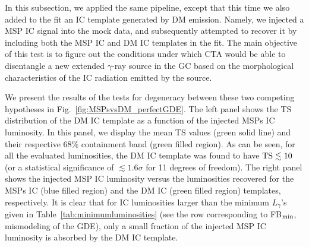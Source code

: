 \documentclass[doublespace,nopageskip]{VTthesis} %
\begin{document}
In this subsection, we applied the same pipeline, except that this time we also added to the fit an IC template generated by DM emission. Namely, we injected a MSP IC signal into the mock data, and subsequently attempted to recover it by including both the MSP IC and DM IC templates in the fit. The main objective of this test is to figure out the conditions under which CTA would be able to disentangle a new extended $\gamma$-ray source in the GC based on the morphological characteristics of the IC radiation emitted by the source.

We present the results of the tests for degeneracy between these two competing hypotheses in Fig.~\ref{fig:MSPsvsDM_perfectGDE}. The left panel shows the TS distribution of the DM IC template as a function of the injected MSPs IC luminosity. In this panel, we display the mean TS values (green solid line) and their respective 68\% containment band (green filled region). As can be seen, for all the evaluated luminosities, the DM IC template was found to have ${\rm TS}\lesssim 10$ (or a statistical significance of $\lesssim 1.6\sigma$ for 11 degrees of freedom). The right panel shows the injected MSP IC luminosity versus the luminosities recovered for the MSPs IC (blue filled region) and the DM IC (green filled region) templates, respectively. It is clear that for IC luminosities larger than the minimum $L_{\gamma}$'s given in Table~\ref{tab:minimumluminosities} (see the row corresponding to FB$_{\rm min}$, mismodeling of the GDE), only a small fraction of the injected MSP IC luminosity is absorbed by the DM IC template. 
\end{document}
